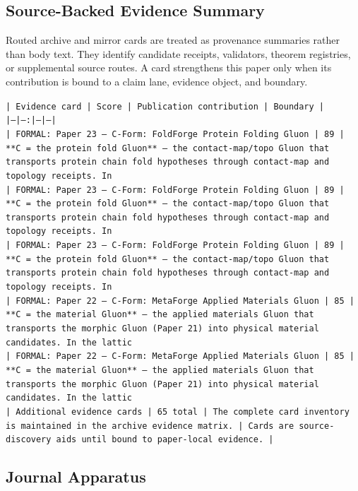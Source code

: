 \documentclass[11pt]{article}
\begin{document}
\subsection*{Source-Backed Evidence Summary}

Routed archive and mirror cards are treated as provenance summaries rather than
body text. They identify candidate receipts, validators, theorem registries, or
supplemental source routes. A card strengthens this paper only when its
contribution is bound to a claim lane, evidence object, and boundary.

\noindent\texttt{| Evidence card | Score | Publication contribution | Boundary |}\\
\noindent\texttt{|---|---:|---|---|}\\
\noindent\texttt{| FORMAL: Paper 23 — C-Form: FoldForge Protein Folding Gluon | 89 | **C = the protein fold Gluon** — the contact-map/topo Gluon that transports protein chain fold hypotheses through contact-map and topology receipts. In }\\
\noindent\texttt{| FORMAL: Paper 23 — C-Form: FoldForge Protein Folding Gluon | 89 | **C = the protein fold Gluon** — the contact-map/topo Gluon that transports protein chain fold hypotheses through contact-map and topology receipts. In }\\
\noindent\texttt{| FORMAL: Paper 23 — C-Form: FoldForge Protein Folding Gluon | 89 | **C = the protein fold Gluon** — the contact-map/topo Gluon that transports protein chain fold hypotheses through contact-map and topology receipts. In }\\
\noindent\texttt{| FORMAL: Paper 22 — C-Form: MetaForge Applied Materials Gluon | 85 | **C = the material Gluon** — the applied materials Gluon that transports the morphic Gluon (Paper 21) into physical material candidates. In the lattic}\\
\noindent\texttt{| FORMAL: Paper 22 — C-Form: MetaForge Applied Materials Gluon | 85 | **C = the material Gluon** — the applied materials Gluon that transports the morphic Gluon (Paper 21) into physical material candidates. In the lattic}\\
\noindent\texttt{| Additional evidence cards | 65 total | The complete card inventory is maintained in the archive evidence matrix. | Cards are source-discovery aids until bound to paper-local evidence. |}\\

\subsection*{Journal Apparatus}
\end{document}
